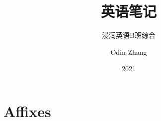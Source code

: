 \documentclass{mybook}
\title{英语笔记}
\subtitle{浸润英语B班综合}
\author{Odin Zhang}
\date{2021}
\begin{document}
\maketitle
\tableofcontents
\part{Affixes}


\end{document}
